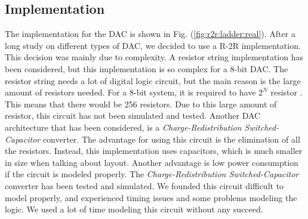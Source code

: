 \documentclass[english, 12pt, a4paper]{ifimaster}
\begin{document}
\subsection{Implementation}
The implementation for the DAC is shown in Fig. (\ref{fig:r2r:ladder:real}). After a long study on different types of DAC, we decided to use a R-2R implementation. This decision was mainly due to 
complexity. A resistor string implementation has been considered, but this implementation is so complex for a 8-bit DAC. The resistor string needs a lot of digital logic circuit, but the main 
reason is the large amount of resistors needed. For a 8-bit system, it is required to have \(2^N\) resistor \cite{carusone}. This means that there would be 256 resistors. Due to this large amount of resistor, 
this circuit has not been simulated and tested. Another DAC architecture that has been considered, is a \textit{Charge-Redistribution Switched-Capacitor} converter. The advantage for using this circuit 
is the elimination of all the resistors. Instead, this implementation uses capacitors, which is much smaller in size when talking about layout. Another advantage is low power consumption if the
circuit is modeled properly. The \textit{Charge-Redistribution Switched-Capacitor} converter has been tested and simulated. We founded this circuit difficult to model properly, and experienced 
timing issues and some problems modeling the logic. We used a lot of time modeling this circuit without any succeed.\\
\end{document}
